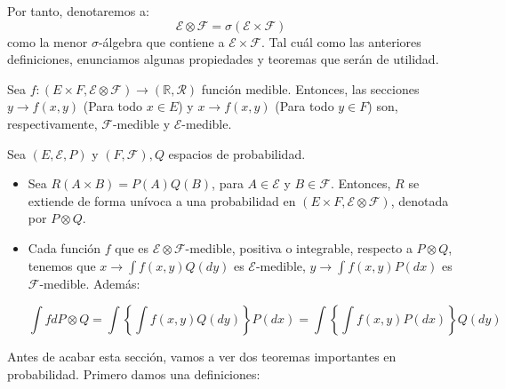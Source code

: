 Por tanto, denotaremos a:
\[
	\mathcal{E} \otimes \mathcal{F} = \sigma(\mathcal{E} \times \mathcal{F})
\]
como la menor $\sigma$-álgebra que contiene a $\mathcal{E} \times \mathcal{F}$. Tal cuál como las anteriores definiciones, enunciamos algunas propiedades y teoremas que serán de utilidad.

\begin{theorem}
	Sea $f: (E\times F, \mathcal{E} \otimes \mathcal{F}) \rightarrow (\mathbb{R}, \mathcal{R})$ función medible. Entonces, las secciones $y \rightarrow f(x, y)$ (Para todo $x \in E$) y $x \rightarrow f(x, y)$ (Para todo $y \in F$) son, respectivamente, $\mathcal{F}$-medible y $\mathcal{E}$-medible.
\end{theorem}

\begin{theorem}
	Sea $(E, \mathcal{E}, P)$ y $(F, \mathcal{F}), Q$ espacios de probabilidad. 

	\begin{itemize}
		\item Sea $R(A \times B) = P(A)Q(B)$, para $A \in \mathcal{E}$ y $B \in \mathcal{F}$. Entonces, $R$ se extiende de forma unívoca a una probabilidad en $(E \times F, \mathcal{E} \otimes \mathcal{F})$, denotada por $P \otimes Q$.

		\item Cada función $f$ que es $\mathcal{E} \otimes \mathcal{F}$-medible, positiva o integrable, respecto a $P \otimes Q$, tenemos que $x \rightarrow \int f(x,y) Q(dy)$ es $\mathcal{E}$-medible, $y \rightarrow \int f(x,y) P(dx)$ es $\mathcal{F}$-medible. Además:

		\[
			\int f dP\otimes Q = \int \left\{ \int f(x,y) Q(dy) \right\} P(dx) = \int \left\{ \int f(x,y) P(dx) \right\} Q(dy)
		\]

	\end{itemize}

\end{theorem}


Antes de acabar esta sección, vamos a ver dos teoremas importantes en probabilidad. Primero damos una definiciones:

